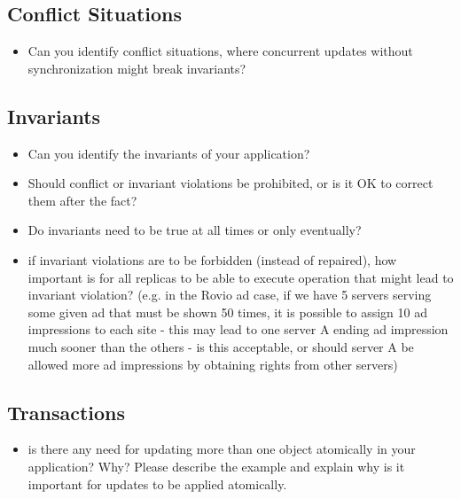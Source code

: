 \documentclass[11pt,a4paper]{report}
\begin{document}
\subsection{Conflict Situations}
\begin{itemize}
\item Can you identify conﬂict situations, where concurrent updates without synchronization might break invariants?
\end{itemize}

\subsection{Invariants}
\begin{itemize}
\item Can you identify the invariants of your application?
\item Should conﬂict or invariant violations be prohibited, or is it OK to correct them after the fact?
\item Do invariants need to be true at all times or only eventually?
\item if invariant violations are to be forbidden (instead of repaired), how important is for all replicas to be able to execute operation that might lead to invariant violation? 
(e.g. in the Rovio ad case, if we have 5 servers serving some given ad that must be shown 50 times, it is possible to assign 10 ad impressions to each site - this may lead to one server A ending ad impression much sooner than the others - is this acceptable, or should server A be allowed more ad impressions by obtaining rights from other servers)
\end{itemize}

\subsection{Transactions}
\begin{itemize}
\item is there any need for updating more than one object atomically in your application? Why?
Please describe the example and explain why is it important for updates to be applied atomically.
\end{itemize}
\end{document}
